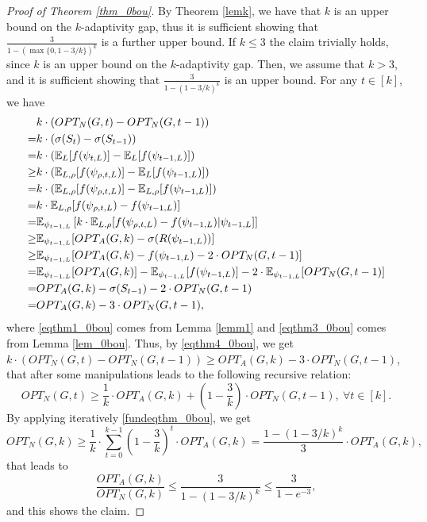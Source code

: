 \begin{proof}[Proof of Theorem \ref{thm_0bou}] By Theorem \ref{lemk}, we have that $k$ is an upper bound on the $k$-adaptivity gap, thus it is sufficient showing that $\frac{3}{1-(\max\{0,1-3/k\})^k}$ is a further upper bound.  If $k\leq 3$ the claim trivially holds, since $k$ is an upper bound on the $k$-adaptivity gap. Then, we assume that $k>3$, and it is sufficient showing that $\frac{3}{1-(1-3/k)^k}$ is an upper bound. For any $t\in [k]$, we have
\begin{align}
&k\cdot (OPT_N(G,t)-OPT_N(G,t-1))\nonumber\\
=&k\cdot (\sigma(S_t)-\sigma(S_{t-1}))\nonumber\\
=&k\cdot (\mathbb{E}_L[f(\psi_{t,L})]-\mathbb{E}_L[f(\psi_{t-1,L})])\nonumber\\
\geq &k\cdot (\mathbb{E}_{L,\rho}[f({\psi}_{\rho,t,L})]-\mathbb{E}_L[f(\psi_{t-1,L})])\nonumber\\
= &k\cdot (\mathbb{E}_{L,\rho}[f({\psi}_{\rho,t,L})]-\mathbb{E}_{L,\rho}[f(\psi_{t-1,L})])\nonumber\\
=&k\cdot \mathbb{E}_{L,\rho}[f({\psi}_{\rho,t,L})-f(\psi_{t-1,L})]\nonumber\\
=& \mathbb{E}_{\psi_{t-1,L}}\left[k\cdot \mathbb{E}_{L,\rho}[f({\psi}_{\rho,t,L})-f(\psi_{t-1,L})|\psi_{t-1,L}]\right]\nonumber\\
\geq &\mathbb{E}_{\psi_{t-1,L}}[OPT_A(G,k)-\sigma(R(\psi_{t-1,L}))]\label{eqthm1_0bou}\\
\geq &\mathbb{E}_{\psi_{t-1,L}}[OPT_A(G,k)-f(\psi_{t-1,L})-2\cdot OPT_N(G,t-1)]\label{eqthm3_0bou}\\
=& \mathbb{E}_{\psi_{t-1,L}}[OPT_A(G,k)]-\mathbb{E}_{\psi_{t-1,L}}[f(\psi_{t-1,L})]-2\cdot\mathbb{E}_{\psi_{t-1,L}}[OPT_N(G,t-1)]\nonumber\\
= &OPT_A(G,k)-\sigma(S_{t-1})-2\cdot OPT_N(G,t-1)\nonumber\\
= &OPT_A(G,k)-3\cdot OPT_N(G,t-1)\label{eqthm4_0bou},
\end{align}
where \eqref{eqthm1_0bou} comes from Lemma \ref{lemm1} and \eqref{eqthm3_0bou} comes from Lemma \ref{lem_0bou}. Thus, by \eqref{eqthm4_0bou}, we get $k\cdot (OPT_N(G,t)-OPT_N(G,t-1))\geq OPT_A(G,k)-3\cdot OPT_N(G,t-1)$, that after some manipulations leads to the following recursive relation:
\begin{equation}\label{fundeqthm_0bou}
OPT_N(G,t)\geq \frac{1}{k}\cdot OPT_A(G,k)+\left(1-\frac{3}{k}\right)\cdot OPT_N(G,t-1),\ \forall t\in [k].
\end{equation}
By applying iteratively \eqref{fundeqthm_0bou}, we get
\begin{equation*}
OPT_N(G,k)\geq \frac{1}{k}\cdot \sum_{t=0}^{k-1}\left(1-\frac{3}{k}\right)^{t}\cdot OPT_A(G,k)=\frac{1-\left(1-3/k\right)^k}{3}\cdot OPT_A(G,k),
\end{equation*}
that leads to 
\begin{equation}
\frac{OPT_A(G,k)}{OPT_N(G,k)}\leq \frac{3}{1-(1-3/k)^k}\leq \frac{3}{1-e^{-3}},
\end{equation}
and this shows the claim.
\end{proof}

